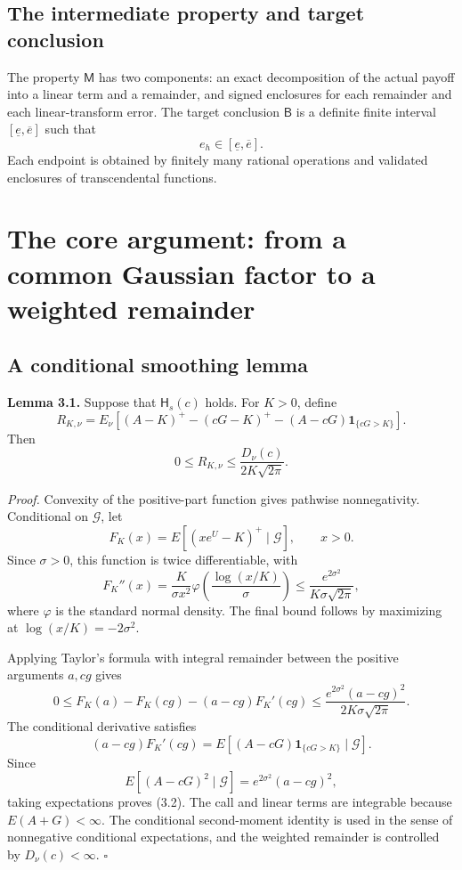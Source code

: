 \subsection{The intermediate property and target conclusion}

The property \(\mathsf M\) has two components: an exact decomposition of the actual payoff into a linear term and a remainder, and signed enclosures for each remainder and each linear-transform error. The target conclusion \(\mathsf B\) is a definite finite interval \([\underline e,\overline e]\) such that
\[
e_h\in[\underline e,\overline e].
\tag{2.8}
\]
Each endpoint is obtained by finitely many rational operations and validated enclosures of transcendental functions.

\section{The core argument: from a common Gaussian factor to a weighted remainder}

\subsection{A conditional smoothing lemma}

\textbf{Lemma 3.1.} Suppose that \(\mathsf H_s(c)\) holds. For \(K>0\), define
\[
R_{K,\nu}=E_\nu\!\left[(A-K)^+-(cG-K)^+
-(A-cG)\mathbf1_{\{cG>K\}}\right].
\tag{3.1}
\]
Then
\[
0\le R_{K,\nu}\le \frac{D_\nu(c)}{2K\sqrt{2\pi}}.
\tag{3.2}
\]

\textit{Proof.} Convexity of the positive-part function gives pathwise nonnegativity. Conditional on \(\mathcal G\), let
\[
F_K(x)=E[(xe^U-K)^+\mid\mathcal G],\qquad x>0.
\]
Since \(\sigma>0\), this function is twice differentiable, with
\[
F_K''(x)=\frac{K}{\sigma x^2}
\varphi\!\left(\frac{\log(x/K)}{\sigma}\right)
\le\frac{e^{2\sigma^2}}{K\sigma\sqrt{2\pi}},
\tag{3.3}
\]
where \(\varphi\) is the standard normal density. The final bound follows by maximizing at
\(\log(x/K)=-2\sigma^2\).

Applying Taylor's formula with integral remainder between the positive arguments \(a,cg\) gives
\[
0\le F_K(a)-F_K(cg)-(a-cg)F_K'(cg)
\le \frac{e^{2\sigma^2}(a-cg)^2}{2K\sigma\sqrt{2\pi}}.
\]
The conditional derivative satisfies
\[
(a-cg)F_K'(cg)
=E[(A-cG)\mathbf1_{\{cG>K\}}\mid\mathcal G].
\]
Since
\[
E[(A-cG)^2\mid\mathcal G]=e^{2\sigma^2}(a-cg)^2,
\]
taking expectations proves (3.2). The call and linear terms are integrable because \(E(A+G)<\infty\). The conditional second-moment identity is used in the sense of nonnegative conditional expectations, and the weighted remainder is controlled by \(D_\nu(c)<\infty\). \hfill\(\square\)

